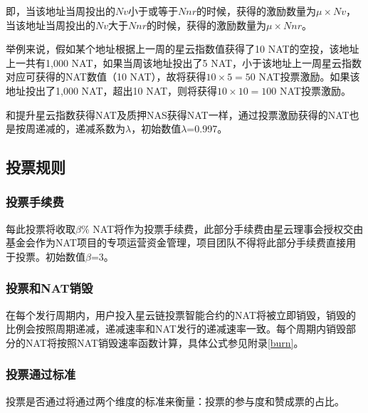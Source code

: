 即，当该地址当周投出的$Nv$小于或等于$Nnr$的时候，获得的激励数量为$\mu\times Nv$，当该地址当周投出的$Nv$大于$Nnr$的时候，获得的激励数量为$\mu\times Nnr$。

举例来说，假如某个地址根据上一周的星云指数值获得了10 NAT的空投，该地址上一共有1,000 NAT，如果当周该地址投出了5 NAT，小于该地址上一周星云指数对应可获得的NAT数值（10 NAT），故将获得$10\times5=50$ NAT投票激励。如果该地址投出了1,000 NAT，超出10 NAT，则将获得$10\times10=100$ NAT投票激励。

和提升星云指数获得NAT及质押NAS获得NAT一样，通过投票激励获得的NAT也是按周递减的，递减系数为$\lambda$，初始数值$\lambda$=0.997。

\subsection{投票规则}
	
\subsubsection{投票手续费}

每此投票将收取$\beta$\% NAT将作为投票手续费，此部分手续费由星云理事会授权交由基金会作为NAT项目的专项运营资金管理，项目团队不得将此部分手续费直接用于投票。初始数值$\beta$=3。

\subsubsection{投票和NAT销毁}

在每个发行周期内，用户投入星云链投票智能合约的NAT将被立即销毁，销毁的比例会按照周期递减，递减速率和NAT发行的递减速率一致。每个周期内销毁部分的NAT将按照NAT销毁速率函数计算，具体公式参见附录\ref{burn}。

\subsubsection{投票通过标准}
	
投票是否通过将通过两个维度的标准来衡量：投票的参与度和赞成票的占比。

